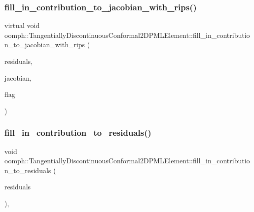 \subsubsection{\texorpdfstring{fill\+\_\+in\+\_\+contribution\+\_\+to\+\_\+jacobian\+\_\+with\+\_\+rips()}{fill\_in\_contribution\_to\_jacobian\_with\_rips()}}
{\footnotesize\ttfamily virtual void oomph\+::\+Tangentially\+Discontinuous\+Conformal2\+D\+P\+M\+L\+Element\+::fill\+\_\+in\+\_\+contribution\+\_\+to\+\_\+jacobian\+\_\+with\+\_\+rips (\begin{DoxyParamCaption}\item[{\hyperlink{classoomph_1_1Vector}{Vector}$<$ double $>$ \&}]{residuals,  }\item[{\hyperlink{classoomph_1_1DenseMatrix}{Dense\+Matrix}$<$ double $>$ \&}]{jacobian,  }\item[{bool}]{flag }\end{DoxyParamCaption})\hspace{0.3cm}{\ttfamily [pure virtual]}}

\mbox{\label{classoomph_1_1TangentiallyDiscontinuousConformal2DPMLElement_a9f5ccd0826199bd3161c5d67c14344b3}} 
\subsubsection{\texorpdfstring{fill\+\_\+in\+\_\+contribution\+\_\+to\+\_\+residuals()}{fill\_in\_contribution\_to\_residuals()}}
{\footnotesize\ttfamily void oomph\+::\+Tangentially\+Discontinuous\+Conformal2\+D\+P\+M\+L\+Element\+::fill\+\_\+in\+\_\+contribution\+\_\+to\+\_\+residuals (\begin{DoxyParamCaption}\item[{\hyperlink{classoomph_1_1Vector}{Vector}$<$ double $>$ \&}]{residuals }\end{DoxyParamCaption})\hspace{0.3cm}{\ttfamily [inline]}, {\ttfamily [virtual]}}



